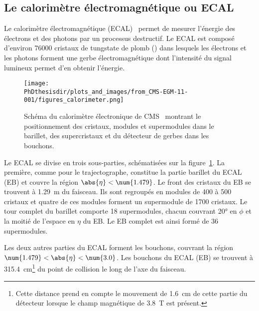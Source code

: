 \subsection{Le calorimètre électromagnétique ou ECAL}\label{chapter-LHC-section-CMS-subsec-ECAL}
Le calorimètre électromagnétique (ECAL)~\cite{cms_paper,CERN-LHCC-97-033,CMS-EGM-11-001,CMS-DP-2019-005,CMS-DP-2020-021} permet de mesurer l'énergie des électrons et des photons par un processus destructif.
Le ECAL est composé d'environ \num{76000} cristaux de tungstate de plomb () dans lesquels les électrons et les photons forment une gerbe électromagnétique dont l'intensité du signal lumineux permet d'en obtenir l'énergie.
\begin{figure}[h]
\centering
\texttt{[image: \\PhDthesisdir/plots\_and\_images/from\_CMS-EGM-11-001/figures\_calorimeter.png]}
\caption[Schéma du calorimètre électronique de CMS.]{Schéma du calorimètre électronique de CMS~\cite{cms_paper,CMS-EGM-11-001} montrant le positionnement des cristaux, modules et supermodules dans le barillet, des supercristaux et du détecteur de gerbes dans les bouchons.}
\label{fig-chapter-LHC-section-CMS-subsec-ECAL-CMS-EGM-11-001-figures_calorimeter}
\end{figure}
\par Le ECAL se divise en trois sous-parties, schématisées sur la figure~\ref{fig-chapter-LHC-section-CMS-subsec-ECAL-CMS-EGM-11-001-figures_calorimeter}.
La première, comme pour le trajectographe, constitue la partie barillet du ECAL (EB) et couvre la région $\abs{\eta}<\num{1.479}$.
Le front des cristaux du EB se trouvent à \SI{1.29}{\meter} du faisceau.
Ils sont regroupés en \og modules \fg{} de \num{400} à \num{500} cristaux et quatre de ces modules forment un \og supermodule \fg{} de \num{1700} cristaux.
Le tour complet du barillet comporte \num{18} supermodules, chacun couvrant \ang{20} en $\phi$ et la moitié de l'espace en $\eta$ du EB.
Le EB complet est ainsi formé de \num{36} supermodules.
\par Les deux autres parties du ECAL forment les bouchons, couvrant la région $\num{1.479}<\abs{\eta}<\num{3.0}$.
Les bouchons du ECAL (EB) se trouvent à \SI{315.4}{\centi\meter}\footnote{Cette distance prend en compte le mouvement de \SI{1.6}{\centi\meter} de cette partie du détecteur lorsque le champ magnétique de \SI{3.8}{\tesla} est présent.} du point de collision le long de l'axe du faisceau.
